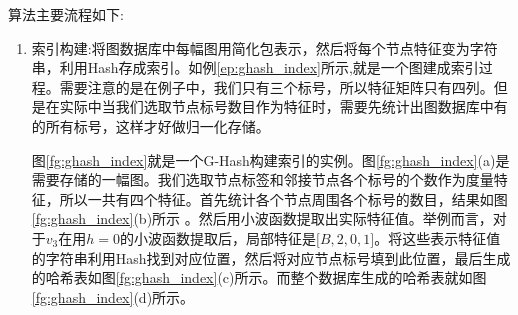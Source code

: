 \documentclass{XDBAthesis}
\begin{document}
算法主要流程如下:
\begin{enumerate}
    \item 索引构建:将图数据库中每幅图用简化包表示，然后将每个节点特征变为字符串，利用Hash存成索引。如例\ref{ep:ghash_index}所示,就是一个图建成索引过程。需要注意的是在例子中，我们只有三个标号，所以特征矩阵只有四列。但是在实际中当我们选取节点标号数目作为特征时，需要先统计出图数据库中有的所有标号，这样才好做归一化存储。
    \begin{exmp}
        图\ref{fg:ghash_index}就是一个G-Hash构建索引的实例。图\ref{fg:ghash_index}(a)是需要存储的一幅图。我们选取节点标签和邻接节点各个标号的个数作为度量特征，所以一共有四个特征。首先统计各个节点周围各个标号的数目，结果如图\ref{fg:ghash_index}(b)所示 。然后用小波函数提取出实际特征值。举例而言，对于$v_{3}$在用$h=0$的小波函数提取后，局部特征是$\lbrack B,2,0,1\rbrack $。将这些表示特征值的字符串利用Hash找到对应位置，然后将对应节点标号填到此位置，最后生成的哈希表如图\ref{fg:ghash_index}(c)所示。而整个数据库生成的哈希表就如图\ref{fg:ghash_index}(d)所示。
        \label{ep:ghash_index}
            

\end{exmp}
\end{enumerate}
\end{document}
